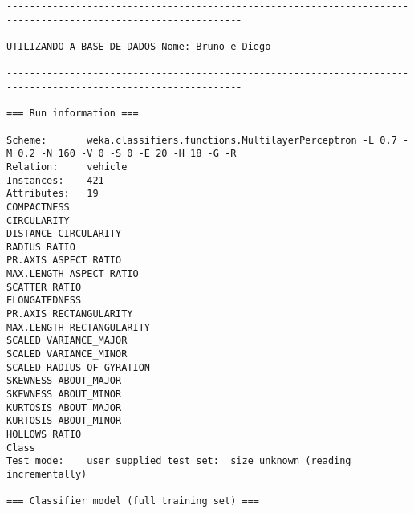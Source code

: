 \documentclass[
	article,			%
	11pt,				%
	oneside,			%
	a4paper,			%
	english,			%
	brazil,				%
	sumario=tradicional
	]{abntex2}
\begin{document}
\begin{lstlisting}
---------------------------------------------------------------------------------------------------------------

UTILIZANDO A BASE DE DADOS Nome: Bruno e Diego

---------------------------------------------------------------------------------------------------------------

=== Run information ===

Scheme:       weka.classifiers.functions.MultilayerPerceptron -L 0.7 -M 0.2 -N 160 -V 0 -S 0 -E 20 -H 18 -G -R
Relation:     vehicle
Instances:    421
Attributes:   19
COMPACTNESS
CIRCULARITY
DISTANCE CIRCULARITY
RADIUS RATIO
PR.AXIS ASPECT RATIO
MAX.LENGTH ASPECT RATIO
SCATTER RATIO
ELONGATEDNESS
PR.AXIS RECTANGULARITY
MAX.LENGTH RECTANGULARITY
SCALED VARIANCE_MAJOR
SCALED VARIANCE_MINOR
SCALED RADIUS OF GYRATION
SKEWNESS ABOUT_MAJOR
SKEWNESS ABOUT_MINOR
KURTOSIS ABOUT_MAJOR
KURTOSIS ABOUT_MINOR
HOLLOWS RATIO
Class
Test mode:    user supplied test set:  size unknown (reading incrementally)

=== Classifier model (full training set) ===


\end{lstlisting}
\end{document}
